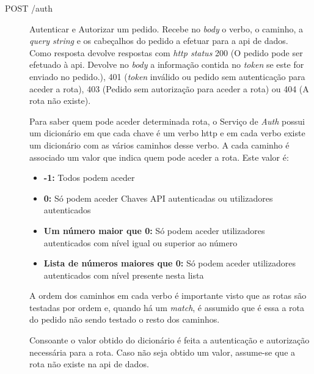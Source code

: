 \begin{description}
    \item[POST /auth] Autenticar e Autorizar um pedido. Recebe no \textit{body} o verbo, o caminho, a \textit{query string} e os cabeçalhos do pedido a efetuar para a \acrshort{api} de dados. Como resposta devolve respostas com \textit{\acrshort{http} status} 200 (O pedido pode ser efetuado à \acrshort{api}. Devolve no \textit{body}  a informação contida no \textit{token} se este for enviado no pedido.), 401 (\textit{token} inválido ou pedido sem autenticação para aceder a rota), 403 (Pedido sem autorização para aceder a rota) ou 404 (A rota não existe).

        Para saber quem pode aceder determinada rota, o Serviço de \textit{Auth} possui um dicionário em que cada chave é um verbo \acrshort{http} e em cada verbo existe um dicionário com as vários caminhos desse verbo. A cada caminho é associado um valor que indica quem pode aceder a rota. Este valor é:
        \begin{itemize}
            \item \textbf{-1:} Todos podem aceder
            \item \textbf{0:} Só podem aceder Chaves API autenticadas ou utilizadores autenticados
            \item \textbf{Um número maior que 0:} Só podem aceder utilizadores autenticados com nível igual ou superior ao número
            \item \textbf{Lista de números maiores que 0:} Só podem aceder utilizadores autenticados com nível presente nesta lista
        \end{itemize}
        A ordem dos caminhos em cada verbo é importante visto que as rotas são testadas por ordem e, quando há um \textit{match}, é assumido que é essa a rota do pedido não sendo testado o resto dos caminhos.

        Consoante o valor obtido do dicionário é feita a autenticação e autorização necessária para a rota. Caso não seja obtido um valor, assume-se que a rota não existe na \acrshort{api} de dados.


\end{description}
